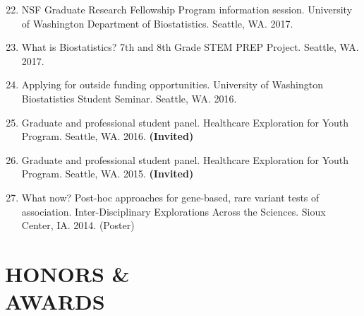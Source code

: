 \documentclass[margin]{res}
\newenvironment{benumerate}[1]{
    \let\oldItem\item
    \def\item{\addtocounter{enumi}{-2}\oldItem}
    
    \begin{enumerate}
    \setcounter{enumi}{#1}
    \addtocounter{enumi}{1}
}{
    \end{enumerate}
}
\begin{document}
\begin{resume}
\begin{benumerate}{21}
\item %
NSF Graduate Research Fellowship Program information session. University of Washington Department of Biostatistics. Seattle, WA. 2017.

\item %
What is Biostatistics? 7th and 8th Grade STEM PREP Project. Seattle, WA. 2017. %

\item %
Applying for outside funding opportunities. University of Washington Biostatistics Student Seminar. Seattle, WA. 2016.

\item Graduate and professional student panel. Healthcare Exploration for Youth Program. Seattle, WA. 2016. \textbf{(Invited)}

\item Graduate and professional student panel. Healthcare Exploration for Youth Program. Seattle, WA. 2015. \textbf{(Invited)}

\item %
What now? Post-hoc approaches for gene-based, rare variant tests of association. Inter-Disciplinary Explorations Across the Sciences. Sioux Center, IA. 2014.  (Poster)\\
\end{benumerate}


\section{HONORS \& \\ AWARDS}


\end{resume}
\end{document}
